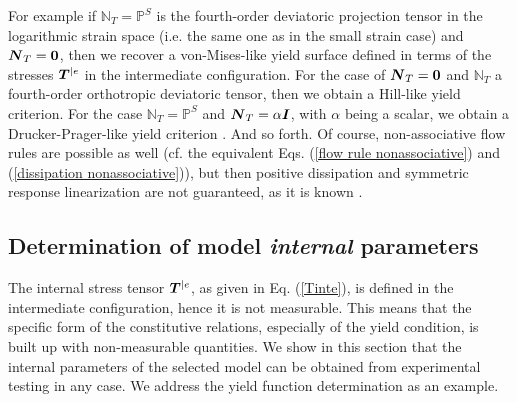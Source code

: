 \documentclass[preprint,review,12pt,sort&compress]{elsarticle}%
\renewcommand{\mathbf}[1]{\mbox{\boldmath $#1$ \unboldmath}  \!\!}
\begin{document}
For example if $\mathbb{N}_{T}=\mathbb{P}^{S}$ is the fourth-order deviatoric
projection tensor in the logarithmic strain space (i.e. the same one as in the
small strain case) and $\mathbf{N}_{T}=\mathbf{0}$, then we recover a
von-Mises-like yield surface defined in terms of the stresses $\mathbf{T}%
^{|e}$ in the intermediate configuration. For the case of $\mathbf{N}%
_{T}=\mathbf{0}$ and $\mathbb{N}_{T}$ a fourth-order orthotropic deviatoric
tensor, then we obtain a Hill-like yield criterion. For the case
$\mathbb{N}_{T}=\mathbb{P}^{S}$ and $\mathbf{N}_{T}=\alpha\mathbf{I}$, with
$\alpha$ being a scalar, we obtain a Drucker-Prager-like yield criterion
\cite{KojicBathe87,Borjabook}. And so forth. Of course, non-associative flow
rules are possible as well (cf. the equivalent Eqs.
(\ref{flow rule nonassociative}) and (\ref{dissipation nonassociative})), but
then positive dissipation and symmetric response linearization are not
guaranteed, as it is known \cite{Simo98}.

\subsection{Determination of model \emph{internal} parameters}

The internal stress tensor $\mathbf{T}^{|e}$, as given in Eq. (\ref{Tinte}),
is defined in the intermediate configuration, hence it is not measurable. This
means that the specific form of the constitutive relations, especially of the
yield condition, is built up with non-measurable quantities. We show in this
section that the internal parameters of the selected model can be obtained
from experimental testing in any case. We address the yield function
determination as an example.
\end{document}
